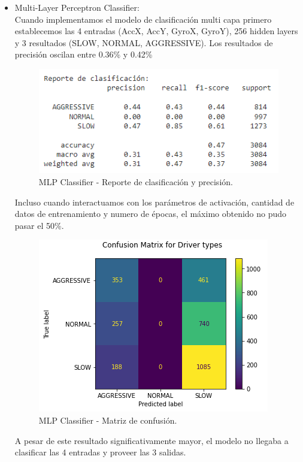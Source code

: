 \documentclass[spanish,12pt,letterpaper]{article}
\begin{document}
\begin{itemize}
    \newpage
    
    \item Multi-Layer Perceptron Classifier:\\
    Cuando implementamos el modelo de clasificación multi capa primero establecemos las 4 entradas (AccX, AccY, GyroX, GyroY), 256 hidden layers y 3 resultados (SLOW, NORMAL, AGGRESSIVE). Los resultados de precisión oscilan entre 0.36\% y 0.42\%\\
    \begin{figure}[H]
        \centering
        \includegraphics[width=0.8\columnwidth]{restest.png}
        \caption{MLP Classifier - Reporte de clasificación y precisión.}
        \label{fig:comand}%
    \end{figure}
    Incluso cuando interactuamos con los parámetros de activación, cantidad de datos de entrenamiento y numero de épocas, el máximo obtenido no pudo pasar el 50\%.\\
     \begin{figure}[H]
        \centering
        \includegraphics[width=0.5\columnwidth]{confucion.png}
        \caption{MLP Classifier - Matriz de confusión.}
        \label{fig:comand}%
    \end{figure}
    A pesar de este resultado significativamente mayor, el modelo no llegaba a clasificar las 4 entradas y proveer las 3 salidas.  
\end{itemize}

\newpage
\end{document}
